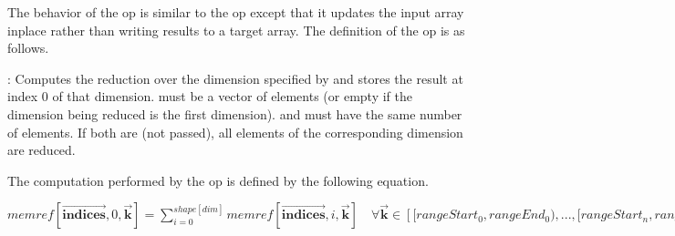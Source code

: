 


The behavior of the  op is similar to the 
 op except that it updates the input array inplace
rather than writing results to a target array. The definition of the 
op is as follows. 

\begin{definition}
 \textbf{}:
  Computes the reduction over the dimension specified by  and stores the 
  result at index 0 of that dimension. \op{[indices]} must be a vector of  elements
   (or empty if the dimension being reduced is the first dimension). \op{[rangeStart]} 
   and \op{[rangeEnd]} must have the same number of elements. If both are  (not passed), 
   all elements of the corresponding dimension are reduced. 
  
  The computation performed by the op is defined by the following equation.
  
  $memref[\vec{\boldsymbol{indices}}, 0, \vec{\boldsymbol{k}}] = \sum_{i=0}^{shape[dim]} memref[\vec{\boldsymbol{indices}}, i, \vec{\boldsymbol{k}}]\quad   \forall \vec{\boldsymbol{k}} \in \left[[rangeStart_0, rangeEnd_0), ... , [rangeStart_n, rangeEnd_n)\right]$  
\end{definition}

